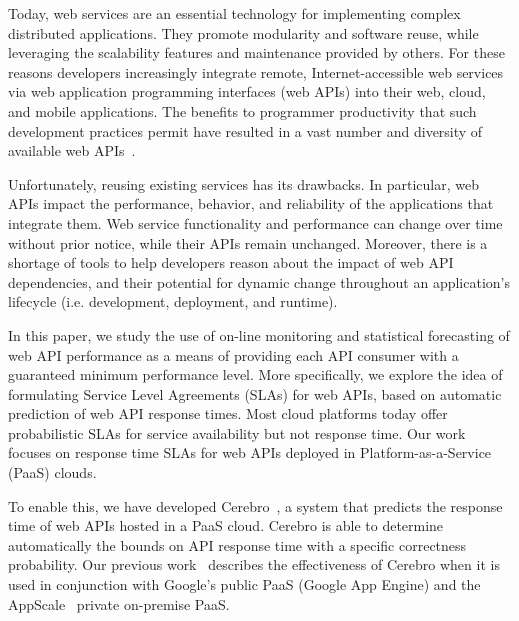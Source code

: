 Today, web services are an essential technology for implementing
complex distributed applications. They promote modularity and software reuse,
while leveraging the scalability features and maintenance 
provided by others. For these reasons developers increasingly integrate remote, 
Internet-accessible web services via web application programming interfaces (web APIs)
into their web, cloud, and mobile applications.  
The benefits to programmer productivity that such development practices
permit have resulted in a vast number and diversity of available web APIs~\cite{pweb}.

Unfortunately, reusing existing services has its drawbacks. In particular, 
web APIs impact the performance, behavior, and reliability of the applications
that integrate them.  Web service functionality and performance can change over time 
without prior notice, while their APIs remain unchanged.
Moreover, there is a shortage of tools to help developers 
reason about the impact of web API dependencies, and their potential for
dynamic change throughout an application's 
lifecycle (i.e. development, deployment, and runtime).  

In this paper, we study the use of on-line monitoring and statistical
forecasting of web API performance as a means of providing each API
consumer with a guaranteed minimum performance level.
More specifically, we explore the idea of formulating Service Level Agreements (SLAs)
for web APIs, based on automatic prediction of web API response times.
Most cloud platforms today offer probabilistic
SLAs for service availability but not response time. 
Our work focuses on response time SLAs for web APIs deployed
in Platform-as-a-Service (PaaS) clouds.


To enable this, we have developed Cerebro~\cite{cerebro-soccsub15},
a system that
predicts the response time of web APIs hosted in a PaaS cloud. Cerebro is able to
determine automatically the bounds on API response time with a specific
correctness probability.
Our previous work~\cite{cerebro-soccsub15} describes the effectiveness of
Cerebro when it is used in conjunction with Google's public PaaS (Google
App Engine) and the AppScale~\cite{6488671} private on-premise PaaS.  

